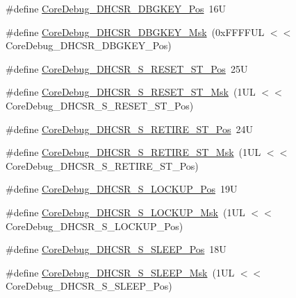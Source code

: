 \begin{DoxyCompactItemize}
\item 
\#define \mbox{\hyperlink{group___c_m_s_i_s___core_debug_gac91280edd0ce932665cf75a23d11d842}{Core\+Debug\+\_\+\+D\+H\+C\+S\+R\+\_\+\+D\+B\+G\+K\+E\+Y\+\_\+\+Pos}}~16U
\item 
\#define \mbox{\hyperlink{group___c_m_s_i_s___core_debug_ga1ce997cee15edaafe4aed77751816ffc}{Core\+Debug\+\_\+\+D\+H\+C\+S\+R\+\_\+\+D\+B\+G\+K\+E\+Y\+\_\+\+Msk}}~(0x\+F\+F\+F\+F\+U\+L $<$$<$ Core\+Debug\+\_\+\+D\+H\+C\+S\+R\+\_\+\+D\+B\+G\+K\+E\+Y\+\_\+\+Pos)
\item 
\#define \mbox{\hyperlink{group___c_m_s_i_s___core_debug_ga6f934c5427ea057394268e541fa97753}{Core\+Debug\+\_\+\+D\+H\+C\+S\+R\+\_\+\+S\+\_\+\+R\+E\+S\+E\+T\+\_\+\+S\+T\+\_\+\+Pos}}~25U
\item 
\#define \mbox{\hyperlink{group___c_m_s_i_s___core_debug_gac474394bcceb31a8e09566c90b3f8922}{Core\+Debug\+\_\+\+D\+H\+C\+S\+R\+\_\+\+S\+\_\+\+R\+E\+S\+E\+T\+\_\+\+S\+T\+\_\+\+Msk}}~(1\+U\+L $<$$<$ Core\+Debug\+\_\+\+D\+H\+C\+S\+R\+\_\+\+S\+\_\+\+R\+E\+S\+E\+T\+\_\+\+S\+T\+\_\+\+Pos)
\item 
\#define \mbox{\hyperlink{group___c_m_s_i_s___core_debug_ga2328118f8b3574c871a53605eb17e730}{Core\+Debug\+\_\+\+D\+H\+C\+S\+R\+\_\+\+S\+\_\+\+R\+E\+T\+I\+R\+E\+\_\+\+S\+T\+\_\+\+Pos}}~24U
\item 
\#define \mbox{\hyperlink{group___c_m_s_i_s___core_debug_ga89dceb5325f6bcb36a0473d65fbfcfa6}{Core\+Debug\+\_\+\+D\+H\+C\+S\+R\+\_\+\+S\+\_\+\+R\+E\+T\+I\+R\+E\+\_\+\+S\+T\+\_\+\+Msk}}~(1\+U\+L $<$$<$ Core\+Debug\+\_\+\+D\+H\+C\+S\+R\+\_\+\+S\+\_\+\+R\+E\+T\+I\+R\+E\+\_\+\+S\+T\+\_\+\+Pos)
\item 
\#define \mbox{\hyperlink{group___c_m_s_i_s___core_debug_ga2900dd56a988a4ed27ad664d5642807e}{Core\+Debug\+\_\+\+D\+H\+C\+S\+R\+\_\+\+S\+\_\+\+L\+O\+C\+K\+U\+P\+\_\+\+Pos}}~19U
\item 
\#define \mbox{\hyperlink{group___c_m_s_i_s___core_debug_ga7b67e4506d7f464ef5dafd6219739756}{Core\+Debug\+\_\+\+D\+H\+C\+S\+R\+\_\+\+S\+\_\+\+L\+O\+C\+K\+U\+P\+\_\+\+Msk}}~(1\+U\+L $<$$<$ Core\+Debug\+\_\+\+D\+H\+C\+S\+R\+\_\+\+S\+\_\+\+L\+O\+C\+K\+U\+P\+\_\+\+Pos)
\item 
\#define \mbox{\hyperlink{group___c_m_s_i_s___core_debug_ga349ccea33accc705595624c2d334fbcb}{Core\+Debug\+\_\+\+D\+H\+C\+S\+R\+\_\+\+S\+\_\+\+S\+L\+E\+E\+P\+\_\+\+Pos}}~18U
\item 
\#define \mbox{\hyperlink{group___c_m_s_i_s___core_debug_ga98d51538e645c2c1a422279cd85a0a25}{Core\+Debug\+\_\+\+D\+H\+C\+S\+R\+\_\+\+S\+\_\+\+S\+L\+E\+E\+P\+\_\+\+Msk}}~(1\+U\+L $<$$<$ Core\+Debug\+\_\+\+D\+H\+C\+S\+R\+\_\+\+S\+\_\+\+S\+L\+E\+E\+P\+\_\+\+Pos)
$$
\end{DoxyCompactItemize}
